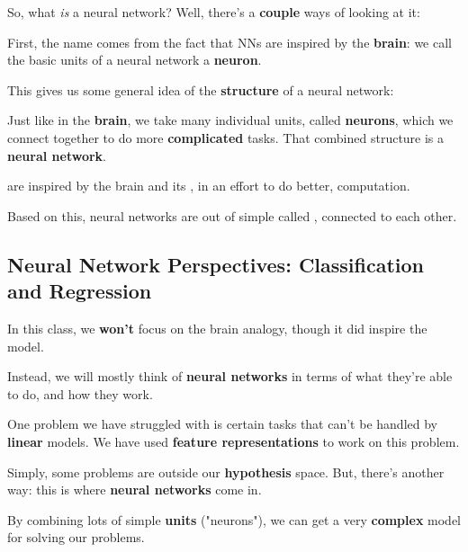         So, what \textit{is} a neural network? Well, there's a \textbf{couple} ways of looking at it:
        
        First, the name comes from the fact that NNs are inspired by the \textbf{brain}: we call the basic units of a neural network a \textbf{neuron}.
        
        This gives us some general idea of the \textbf{structure} of a neural network:
        
        Just like in the \textbf{brain}, we take many individual units, called \textbf{neurons}, which we connect together to do more \textbf{complicated} tasks. That combined structure is a \textbf{neural network}.
            \\
        
        \begin{concept}
             are inspired by the brain and its , in an effort to do better,  computation.
            
            Based on this, neural networks are  out of simple  called , connected to each other.
        \end{concept}

        
    \subsection{Neural Network Perspectives: Classification and Regression}
    
        In this class, we \textbf{won't} focus on the brain analogy, though it did inspire the model.
        
        Instead, we will mostly think of \textbf{neural networks} in terms of what they're able to do, and how they work.
        
        One problem we have struggled with is certain tasks that can't be handled by \textbf{linear} models. We have used \textbf{feature representations} to work on this problem.
        
        Simply, some problems are outside our \textbf{hypothesis} space. But, there's another way: this is where \textbf{neural networks} come in.
        
        By combining lots of simple \textbf{units} ("neurons"), we can get a very \textbf{complex} model for solving our problems.
        
